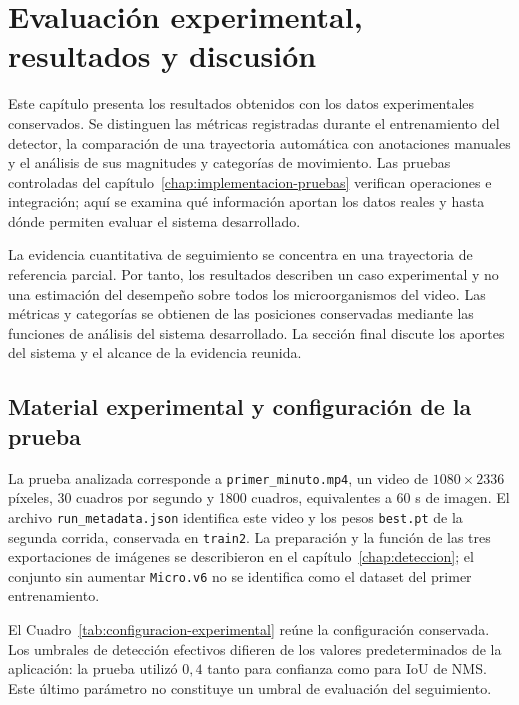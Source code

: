 \chapter{Evaluación experimental, resultados y discusión}
\label{chap:evaluacion-resultados}

Este capítulo presenta los resultados obtenidos con los datos experimentales conservados. Se distinguen las métricas registradas durante el entrenamiento del detector, la comparación de una trayectoria automática con anotaciones manuales y el análisis de sus magnitudes y categorías de movimiento. Las pruebas controladas del capítulo~\ref{chap:implementacion-pruebas} verifican operaciones e integración; aquí se examina qué información aportan los datos reales y hasta dónde permiten evaluar el sistema desarrollado.

La evidencia cuantitativa de seguimiento se concentra en una trayectoria de referencia parcial. Por tanto, los resultados describen un caso experimental y no una estimación del desempeño sobre todos los microorganismos del video. Las métricas y categorías se obtienen de las posiciones conservadas mediante las funciones de análisis del sistema desarrollado. La sección final discute los aportes del sistema y el alcance de la evidencia reunida.

\section{Material experimental y configuración de la prueba}

La prueba analizada corresponde a \texttt{primer\_minuto.mp4}, un video de $1080\times2336$ píxeles, 30 cuadros por segundo y 1800 cuadros, equivalentes a 60 s de imagen. El archivo \texttt{run\_metadata.json} identifica este video y los pesos \texttt{best.pt} de la segunda corrida, conservada en \texttt{train2}. La preparación y la función de las tres exportaciones de imágenes se describieron en el capítulo~\ref{chap:deteccion}; el conjunto sin aumentar \texttt{Micro.v6} no se identifica como el dataset del primer entrenamiento.

El Cuadro~\ref{tab:configuracion-experimental} reúne la configuración conservada. Los umbrales de detección efectivos difieren de los valores predeterminados de la aplicación: la prueba utilizó $0{,}4$ tanto para confianza como para IoU de NMS. Este último parámetro no constituye un umbral de evaluación del seguimiento.

